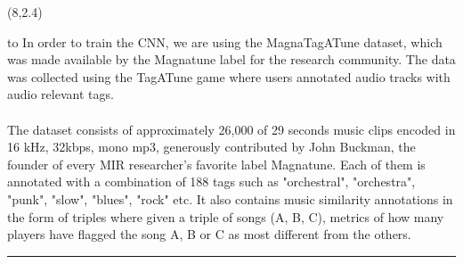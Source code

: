 \documentclass[a0]{a0poster}
\def\Head#1{
  \noindent\hbox to \hsize{\hfil{\LARGE\color{DarkBlue}\sf #1}}\bigskip}
\begin{document}
  \begin{textblock}{7}(8,2.4)
    \Head{Dataset}
    \sf
    In order to train the CNN, we are using the MagnaTagATune dataset, which
    was made available by the Magnatune label for the research community. The
    data was collected using the TagATune game where users annotated audio
    tracks with audio relevant tags.
    \\ \\
    The dataset consists of approximately 26,000 of 29 seconds music clips
    encoded in 16 kHz, 32kbps, mono mp3, generously contributed by John
    Buckman, the founder of every MIR researcher's favorite label Magnatune.
    Each of them is annotated with a combination of 188 tags such as "orchestral",
    "orchestra", "punk", "slow", "blues", "rock" etc. It also contains music
    similarity annotations in the form of triples where given a triple of songs
    (A, B, C), metrics of how many players have flagged the song A, B or C as
    most different from the others. \cite{msd-dataset}

    \bigskip
    \hrule
  \end{textblock}
\end{document}
